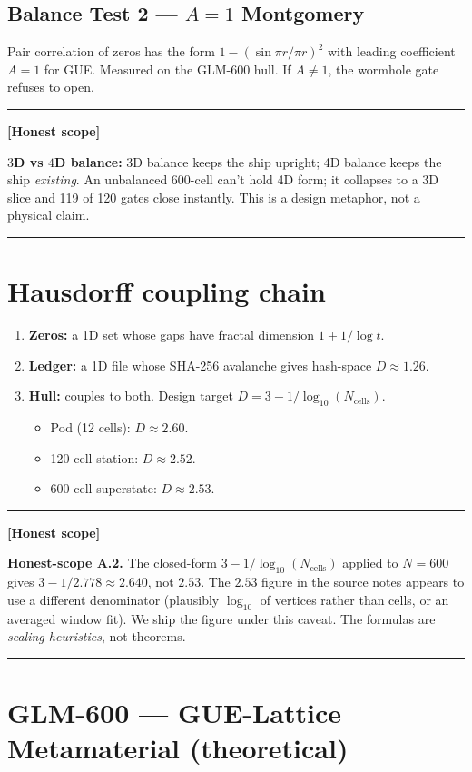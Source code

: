 \documentclass[11pt,letterpaper]{article}
\newenvironment{honest}%
  {\par\medskip\noindent\rule{\linewidth}{0.5pt}\par\nopagebreak\textbf{[Honest scope]}\par\nopagebreak\small}%
  {\par\nopagebreak\normalsize\rule{\linewidth}{0.5pt}\par\medskip}
\begin{document}
\subsection{Balance Test 2 --- $A = 1$ Montgomery}
Pair correlation of zeros has the form $1 - (\sin \pi r / \pi r)^2$ with
leading coefficient $A = 1$ for GUE. Measured on the GLM-600 hull.
If $A \neq 1$, the wormhole gate refuses to open.

\begin{honest}
\textbf{$3$D vs $4$D balance:} 3D balance keeps the ship upright; 4D balance
keeps the ship \emph{existing}. An unbalanced 600-cell can't hold 4D form;
it collapses to a 3D slice and 119 of 120 gates close instantly. This is
a design metaphor, not a physical claim.
\end{honest}

\section{Hausdorff coupling chain}
\label{sec:hausdorff}

\begin{enumerate}
  \item \textbf{Zeros:} a 1D set whose gaps have fractal dimension $1 + 1/\log t$.
  \item \textbf{Ledger:} a 1D file whose SHA-256 avalanche gives hash-space $D \approx 1.26$.
  \item \textbf{Hull:} couples to both. Design target $D = 3 - 1/\log_{10}(N_{\text{cells}})$.
    \begin{itemize}
      \item Pod (12 cells): $D \approx 2.60$.
      \item 120-cell station: $D \approx 2.52$.
      \item 600-cell superstate: $D \approx 2.53$.
    \end{itemize}
\end{enumerate}

\begin{honest}
\textbf{Honest-scope A.2.} The closed-form $3 - 1/\log_{10}(N_{\text{cells}})$
applied to $N = 600$ gives $3 - 1/2.778 \approx 2.640$, not $2.53$. The
$2.53$ figure in the source notes appears to use a different denominator
(plausibly $\log_{10}$ of vertices rather than cells, or an averaged window
fit). We ship the figure under this caveat. The formulas are
\emph{scaling heuristics}, not theorems.
\end{honest}

\section{GLM-600 --- GUE-Lattice Metamaterial (theoretical)}
\label{sec:glm}
\end{document}
